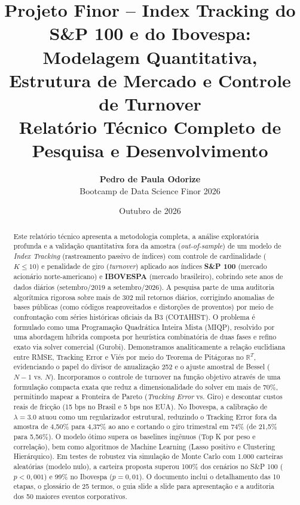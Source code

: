 \documentclass[11pt,a4paper]{article}
\title{\textbf{\LARGE Projeto Finor -- Index Tracking do S\&P 100 e do Ibovespa:}\\[0.3em]
\textbf{\Large Modelagem Quantitativa, Estrutura de Mercado e Controle de Turnover}\\[0.8em]
\large Relatório Técnico Completo de Pesquisa e Desenvolvimento}
\author{\textbf{Pedro de Paula Odorize}\\[0.4em]
\normalsize Bootcamp de Data Science Finor 2026}
\date{Outubro de 2026}
\begin{document}
\maketitle

\begin{abstract}
Este relatório técnico apresenta a metodologia completa, a análise exploratória profunda e a validação quantitativa fora da amostra (\textit{out-of-sample}) de um modelo de \textit{Index Tracking} (rastreamento passivo de índices) com controle de cardinalidade ($K \le 10$) e penalidade de giro (\textit{turnover}) aplicado aos índices \textbf{S\&P 100} (mercado acionário norte-americano) e \textbf{IBOVESPA} (mercado brasileiro), cobrindo sete anos de dados diários (setembro/2019 a setembro/2026). A pesquisa parte de uma auditoria algorítmica rigorosa sobre mais de 302 mil retornos diários, corrigindo anomalias de bases públicas (como códigos reaproveitados e distorções de proventos) por meio de confrontação com séries históricas oficiais da B3 (COTAHIST). O problema é formulado como uma Programação Quadrática Inteira Mista (MIQP), resolvido por uma abordagem híbrida composta por heurística combinatória de duas fases e refino exato via solver comercial (Gurobi). Demonstramos analiticamente a relação euclidiana entre RMSE, Tracking Error e Viés por meio do Teorema de Pitágoras no $\mathbb{R}^T$, evidenciando o papel do divisor de anualização 252 e o ajuste amostral de Bessel ($N-1$ vs. $N$). Incorporamos o controle de turnover na função objetivo através de uma formulação compacta exata que reduz a dimensionalidade do solver em mais de 70\%, permitindo mapear a Fronteira de Pareto (\textit{Tracking Error} vs. Giro) e descontar custos reais de fricção (15 bps no Brasil e 5 bps nos EUA). No Ibovespa, a calibração de $\lambda = 3.0$ atuou como um regularizador estrutural, reduzindo o Tracking Error fora da amostra de 4,50\% para 4,37\% ao ano e cortando o giro trimestral em 74\% (de 21,5\% para 5,56\%). O modelo ótimo supera os baselines ingênuos (Top K por peso e correlação), bem como algoritmos de Machine Learning (Lasso positivo e Clustering Hierárquico). Em testes de robustez via simulação de Monte Carlo com 1.000 carteiras aleatórias (modelo nulo), a carteira proposta superou 100\% dos cenários no S\&P 100 ($p < 0,001$) e 99\% no Ibovespa ($p = 0,01$). O documento inclui o detalhamento das 10 etapas, o glossário de 25 termos, o guia slide a slide para apresentação e a auditoria dos 50 maiores eventos corporativos.
\end{abstract}
\end{document}
